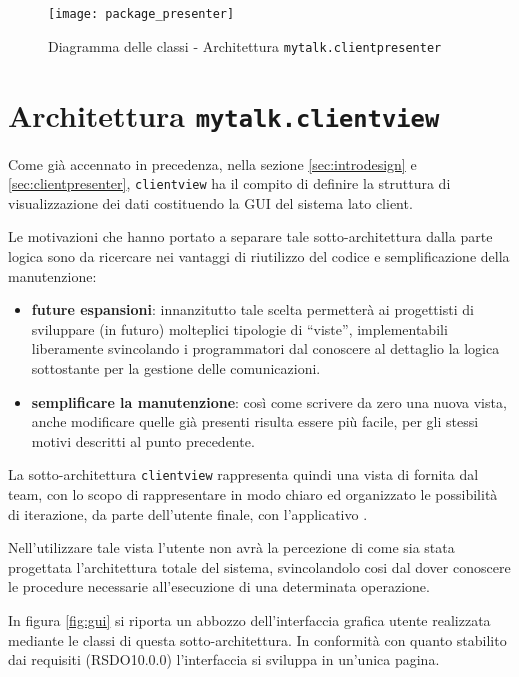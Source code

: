 \begin{figure}[H]
  \centering
  \texttt{[image: package\_presenter]}
  \caption{Diagramma delle classi - Architettura \texttt{mytalk.clientpresenter}}\label{fig:sottoarchpresenter}
  \end{figure}
\clearpage

\section{Architettura \texttt{mytalk.clientview}}\label{sec:clientview}
Come già accennato in precedenza, nella sezione \ref{sec:introdesign} e \ref{sec:clientpresenter}, \texttt{clientview} ha il compito di definire la struttura di visualizzazione dei dati costituendo la GUI del sistema lato client.

Le motivazioni che hanno portato a separare tale sotto-architettura dalla parte logica sono da ricercare nei vantaggi di riutilizzo del codice e semplificazione della manutenzione:
\begin{itemize}
 	\item \textbf{future espansioni}: innanzitutto tale scelta permetterà ai progettisti di sviluppare (in futuro) molteplici tipologie di ``viste'', implementabili liberamente svincolando i programmatori dal conoscere al dettaglio la logica sottostante per la gestione delle comunicazioni.
 	\item \textbf{semplificare la manutenzione}: così come scrivere da zero una nuova vista, anche modificare quelle già presenti risulta essere più facile, per gli stessi motivi descritti al punto precedente.
\end{itemize}

La sotto-architettura \texttt{clientview} rappresenta quindi una vista di  fornita dal team, con lo scopo di rappresentare in modo chiaro ed organizzato le possibilità di iterazione, da parte dell'utente finale, con l'applicativo \caName.

Nell'utilizzare tale vista l'utente non avrà la percezione di come sia stata progettata l'architettura totale del sistema, svincolandolo cosi dal dover conoscere le procedure necessarie all'esecuzione di una determinata operazione.

In figura \ref{fig:gui} si riporta un abbozzo dell'interfaccia grafica utente realizzata mediante le classi di questa sotto-architettura. In conformità con quanto stabilito dai requisiti (RSDO10.0.0) l'interfaccia si sviluppa in un'unica pagina.

